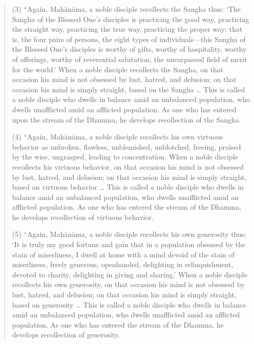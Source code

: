 \begin{quotation}
(3) “Again, Mahānāma, a noble disciple recollects the Sangha thus: ‘The
Sangha of the Blessed One’s disciples is practicing the good way,
practicing the straight way, practicing the true way, practicing the
proper way; that is, the four pairs of persons, the eight types of
individuals—this Sangha of the Blessed One’s disciples is worthy of
gifts, worthy of hospitality, worthy of offerings, worthy of reverential
salutation, the unsurpassed field of merit for the world.’ When a noble
disciple recollects the Sangha, on that occasion his mind is not
obsessed by lust, hatred, and delusion; on that occasion his mind is
simply straight, based on the Sangha \ldots{} This is called a noble disciple
who dwells in balance amid an unbalanced population, who dwells
unafflicted amid an afflicted population. As one who has entered upon
the stream of the Dhamma, he develops recollection of the Sangha.

(4) “Again, Mahānāma, a noble disciple recollects his own virtuous
behavior as unbroken, flawless, unblemished, unblotched, freeing,
praised by the wise, ungrasped, leading to concentration. When a noble
disciple recollects his virtuous behavior, on that occasion his mind is
not obsessed by lust, hatred, and delusion; on that occasion his mind is
simply straight, based on virtuous behavior \ldots{} This is called a noble
disciple who dwells in balance amid an unbalanced population, who dwells
unafflicted amid an afflicted population. As one who has entered the
stream of the Dhamma, he develops recollection of virtuous behavior.

(5) “Again, Mahānāma, a noble disciple recollects his own generosity
thus: ‘It is truly my good fortune and gain that in a population
obsessed by the stain of miserliness, I dwell at home with a mind devoid
of the stain of miserliness, freely generous, openhanded, delighting in
relinquishment, devoted to charity, delighting in giving and sharing.’
When a noble disciple recollects his own generosity, on that occasion
his mind is not obsessed by lust, hatred, and delusion; on that occasion
his mind is simply straight, based on generosity \ldots{} This is called a
noble disciple who dwells in balance amid an unbalanced population, who
dwells unafflicted amid an afflicted population. As one who has entered
the stream of the Dhamma, he develops recollection of generosity.


\end{quotation}
